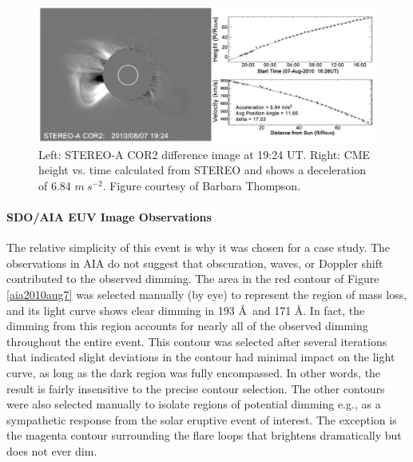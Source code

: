 \begin{figure}[!h]
	\caption[LASCO coronagraph data for 2010 August 7 event]{
        Left: STEREO-A COR2 difference image at 19:24 UT. Right: CME height vs. time calculated from STEREO and shows a 
        deceleration of 6.84 $m\ s^{-2}$. Figure courtesy of Barbara Thompson. 
	}
    \begin{center}
	    \includegraphics[width=150mm]{Images/Stereo2010Aug7Cme.png}
    \end{center}
    \label{stereo2010aug7}
\end{figure}

\paragraph{SDO/AIA EUV Image Observations}
The relative simplicity of this event is why it was chosen for a case study. The observations in AIA do not suggest that obscuration, waves, or Doppler shift contributed to the observed dimming. The area in the red contour of Figure \ref{aia2010aug7} was selected manually (by eye) to represent the region of mass loss, and its light curve shows clear dimming in 193 \AA\ and 171 \AA. In fact, the dimming from this region accounts for nearly all of the observed dimming throughout the entire event. This contour was selected after several iterations that indicated slight deviations in the contour had minimal impact on the light curve, as long as the dark region was fully encompassed. In other words, the result is fairly insensitive to the precise contour selection. The other contours were also selected manually to isolate regions of potential dimming e.g., as a sympathetic response from the solar eruptive event of interest. The exception is the magenta contour surrounding the flare loops that brightens dramatically but does not ever dim. 

